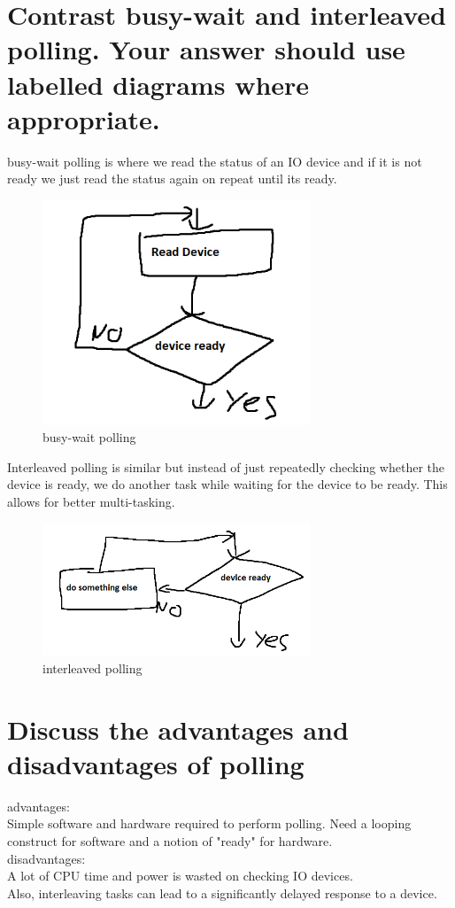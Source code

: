 \documentclass{article}
\begin{document}
\section{Contrast busy-wait and interleaved polling. Your answer should use labelled diagrams where appropriate.}
busy-wait polling is where we read the status of an IO device and if it is not
ready we just read the status again on repeat until its ready.

\begin{figure}[h]
    \centering
    \includegraphics[width = 80mm]{IO3.PNG}
    \caption{busy-wait polling}
    \label{fig:my_label}
\end{figure}

Interleaved polling is similar but instead of just repeatedly checking whether
the device is ready, we do another task while waiting for the device to be
ready. This allows for better multi-tasking.
\begin{figure}[h]
    \centering
    \includegraphics[width = 80mm]{IO.PNG}
    \caption{interleaved polling}
    \label{fig:my_label}
\end{figure}

\section{Discuss the advantages and disadvantages of polling}
advantages:\\
Simple software and hardware required to perform polling. Need a looping
construct for software and a notion of "ready" for hardware.\\
disadvantages:\\
A lot of CPU time and power is wasted on checking IO devices.\\
Also, interleaving tasks can lead to a significantly delayed response to a
device.
\end{document}
